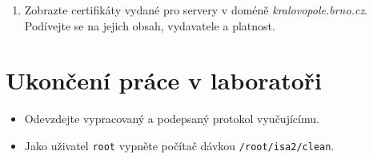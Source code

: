 \documentclass[a4paper,11pt]{article}
\begin{document}
\begin{enumerate}
\begin{enumerate}
      \item Zobrazte certifikáty vydané pro servery v  doméně \emph{kralovopole.brno.cz}. Podívejte se na jejich obsah, vydavatele a platnost. 

    \end{enumerate}

\end{enumerate}


\section{Ukončení práce v laboratoři}
\begin{itemize}
  \item Odevzdejte vypracovaný a podepsaný protokol vyučujícímu. 
  \item Jako uživatel \texttt{root} vypněte počítač dávkou {\tt /root/isa2/clean}.
\end{itemize}
\end{document}
